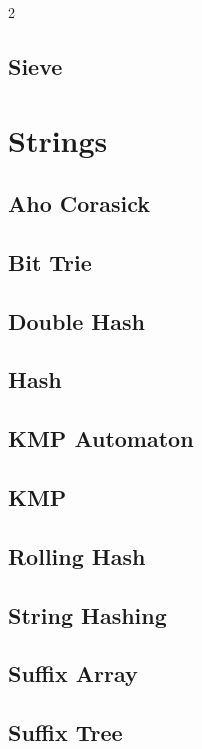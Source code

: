 \documentclass[a4paper,landscape,10pt]{article}
\begin{document}
\begin{multicols*}{2}
\subsection{Sieve}

\section{Strings}
\subsection{Aho Corasick}

\subsection{Bit Trie}

\subsection{Double Hash}

\subsection{Hash}

\subsection{KMP Automaton}

\subsection{KMP}

\subsection{Rolling Hash}

\subsection{String Hashing}

\subsection{Suffix Array}

\subsection{Suffix Tree}


\end{multicols*}
\end{document}
